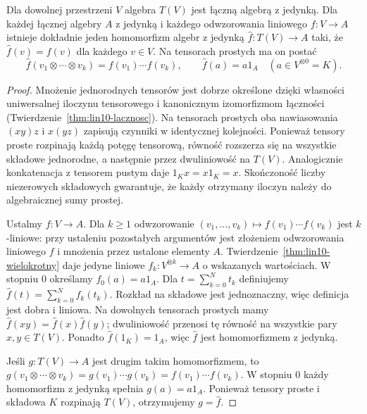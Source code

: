 \begin{twierdzenie}
\label{thm:lin11-tensorowa-uniwersalna}
Dla dowolnej przestrzeni \(V\)
algebra \(T(V)\) jest łączną algebrą z jedynką.
Dla każdej łącznej algebry \(A\) z jedynką
i każdego odwzorowania liniowego
\(f\colon V\to A\)
istnieje dokładnie jeden homomorfizm
algebr z jedynką
\(\widehat f\colon T(V)\to A\) taki, że
\(\widehat f(v)=f(v)\) dla każdego \(v\in V\).
Na tensorach prostych ma on postać
\[
 \widehat f(v_1\otimes\cdots\otimes v_k)
 =f(v_1)\cdots f(v_k),\qquad
 \widehat f(a)=a1_A\quad(a\in V^{\otimes0}=K).
\]
\end{twierdzenie}
\begin{proof}
Mnożenie jednorodnych tensorów jest dobrze
określone dzięki własności uniwersalnej
iloczynu tensorowego i kanonicznym
izomorfizmom łączności
(Twierdzenie~\ref{thm:lin10-lacznosc}).
Na tensorach prostych oba nawiasowania
\((xy)z\) i \(x(yz)\) zapisują czynniki
w identycznej kolejności.
Ponieważ tensory proste rozpinają
każdą potęgę tensorową, równość rozszerza
się na wszystkie składowe jednorodne,
a następnie przez dwuliniowość na \(T(V)\).
Analogicznie konkatenacja z tensorem
pustym daje \(1_Kx=x1_K=x\).
Skończoność liczby niezerowych składowych
gwarantuje, że każdy otrzymany iloczyn
należy do algebraicznej sumy prostej.

Ustalmy \(f\colon V\to A\).
Dla \(k\geq1\) odwzorowanie
\((v_1,\ldots,v_k)\mapsto f(v_1)\cdots f(v_k)\)
jest \(k\)-liniowe: przy ustaleniu
pozostałych argumentów jest złożeniem
odwzorowania liniowego \(f\) i
mnożenia przez ustalone elementy \(A\).
Twierdzenie~\ref{thm:lin10-wielokrotny}
daje jedyne liniowe
\(f_k\colon V^{\otimes k}\to A\)
o wskazanych wartościach.
W stopniu \(0\) określamy
\(f_0(a)=a1_A\).
Dla \(t=\sum_{k=0}^{N}t_k\)
definiujemy
\(\widehat f(t)=\sum_{k=0}^{N}f_k(t_k)\).
Rozkład na składowe jest jednoznaczny,
więc definicja jest dobra i liniowa.
Na dowolnych tensorach prostych mamy
\(\widehat f(xy)=\widehat f(x)\widehat f(y)\);
dwuliniowość przenosi tę równość
na wszystkie pary \(x,y\in T(V)\).
Ponadto \(\widehat f(1_K)=1_A\),
więc \(\widehat f\) jest homomorfizmem
z jedynką.

Jeśli \(g\colon T(V)\to A\) jest drugim
takim homomorfizmem,
to \(g(v_1\otimes\cdots\otimes v_k)
=g(v_1)\cdots g(v_k)
=f(v_1)\cdots f(v_k)\).
W stopniu \(0\) każdy homomorfizm
z jedynką spełnia \(g(a)=a1_A\).
Ponieważ tensory proste i składowa
\(K\) rozpinają \(T(V)\),
otrzymujemy \(g=\widehat f\).
\end{proof}

